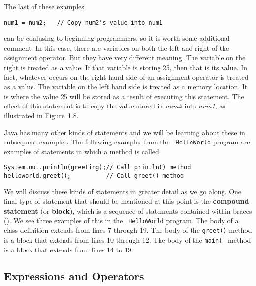 The last of these examples 

\begin{jjjlisting}
\begin{lstlisting}
num1 = num2;   // Copy num2's value into num1
\end{lstlisting}
\end{jjjlisting}

\noindent can be confusing to beginning programmers, so it is worth
some additional comment. In this case, there are variables on both the
left and right of the assignment operator. But they have very
different meaning. The variable on the right is treated as a value. If
that variable is storing 25, then that is its value. In fact, whatever
occurs on the right hand side of an assignment operator is treated as
a value. The variable on the left hand side is treated as a memory
location. It is where the value 25 will be stored as a result of
executing this statement. The effect of this statement is to copy
the value stored in {\it num2} into {\it num1}, as illustrated
in Figure~1.8.

Java has many other kinds of statements and we will be learning about
these in subsequent examples. The following examples from the {\tt
HelloWorld} program are examples of statements in which a method
is called:

\begin{jjjlisting}
\begin{lstlisting}
System.out.println(greeting);// Call println() method
helloworld.greet();          // Call greet() method
\end{lstlisting}
\end{jjjlisting}

\noindent We will discuss these kinds of statements in greater 
detail as we go along. One final type of statement that should be
mentioned at this point is the {\bf compound statement} (or {\bf
block}), which is a sequence of statements contained within braces
({}).  We see three examples of this in the {\tt
HelloWorld} program. The body of a class definition extends from lines
7 through 19. The body of the {\tt greet()} method is a block that
extends from lines 10 through 12. The body of the {\tt main()} method
is a block that extends from lines 14 to 19.

\subsection{Expressions and Operators}
\label{sec-expressions}

